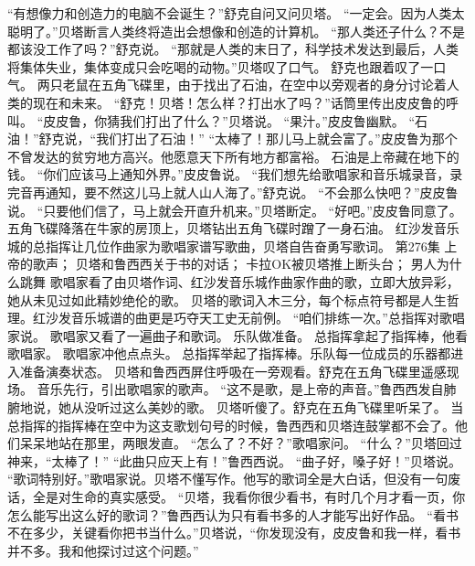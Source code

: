 \documentclass[a4paper,12pt,UTF8,twoside]{ctexbook}
\begin{document}
        “有想像力和创造力的电脑不会诞生？”舒克自问又问贝塔。  
        “一定会。因为人类太聪明了。”贝塔断言人类终将造出会想像和创造的计算机。  
        “那人类还子什么？不是都该没工作了吗？”舒克说。  
        “那就是人类的末日了，科学技术发达到最后，人类将集体失业，集体变成只会吃喝的动物。”贝塔叹了口气。  
        舒克也跟着叹了一口气。  
        两只老鼠在五角飞碟里，由于找出了石油，在空中以旁观者的身分讨论着人类的现在和未来。  
        “舒克！贝塔！怎么样？打出水了吗？”话筒里传出皮皮鲁的呼叫。  
        “皮皮鲁，你猜我们打出了什么？”贝塔说。  
        “果汁。”皮皮鲁幽默。  
        “石油！”舒克说，“我们打出了石油！”  
        “太棒了！那儿马上就会富了。”皮皮鲁为那个不曾发达的贫穷地方高兴。他愿意天下所有地方都富裕。  
        石油是上帝藏在地下的钱。  
        “你们应该马上通知外界。”皮皮鲁说。  
        “我们想先给歌唱家和音乐城录音，录完音再通知，要不然这儿马上就人山人海了。”舒克说。  
        “不会那么快吧？”皮皮鲁说。  
        “只要他们信了，马上就会开直升机来。”贝塔断定。  
        “好吧。”皮皮鲁同意了。  
        五角飞碟降落在牛家的房顶上，贝塔钻出五角飞碟时蹭了一身石油。  
        红沙发音乐城的总指挥让几位作曲家为歌唱家谱写歌曲，贝塔自告奋勇写歌词。          第276集  
        上帝的歌声；  
        贝塔和鲁西西关于书的对话；  
        卡拉OK被贝塔推上断头台；  
        男人为什么跳舞    
        歌唱家看了由贝塔作词、红沙发音乐城作曲家作曲的歌，立即大放异彩，她从未见过如此精妙绝伦的歌。  
        贝塔的歌词入木三分，每个标点符号都是人生哲理。红沙发音乐城谱的曲更是巧夺天工史无前例。  
        “咱们排练一次。”总指挥对歌唱家说。  
        歌唱家又看了一遍曲子和歌词。  
        乐队做准备。  
        总指挥拿起了指挥棒，他看歌唱家。  
        歌唱家冲他点点头。  
        总指挥举起了指挥棒。乐队每一位成员的乐器都进入准备演奏状态。  
        贝塔和鲁西西屏住呼吸在一旁观看。舒克在五角飞碟里遥感现场。  
        音乐先行，引出歌唱家的歌声。  
        “这不是歌，是上帝的声音。”鲁西西发自肺腑地说，她从没听过这么美妙的歌。  
        贝塔听傻了。舒克在五角飞碟里听呆了。  
        当总指挥的指挥棒在空中为这支歌划句号的时候，鲁西西和贝塔连鼓掌都不会了。他们呆呆地站在那里，两眼发直。  
        “怎么了？不好？”歌唱家问。  
        “什么？”贝塔回过神来，“太棒了！”  
        “此曲只应天上有！”鲁西西说。  
        “曲子好，嗓子好！”贝塔说。  
        “歌词特别好。”歌唱家说。贝塔不懂写作。他写的歌词全是大白话，但没有一句废话，全是对生命的真实感受。  
        “贝塔，我看你很少看书，有时几个月才看一页，你怎么能写出这么好的歌词？”鲁西西认为只有看书多的人才能写出好作品。  
        “看书不在多少，关键看你把书当什么。”贝塔说，“你发现没有，皮皮鲁和我一样，看书并不多。我和他探讨过这个问题。”  
\end{document}
